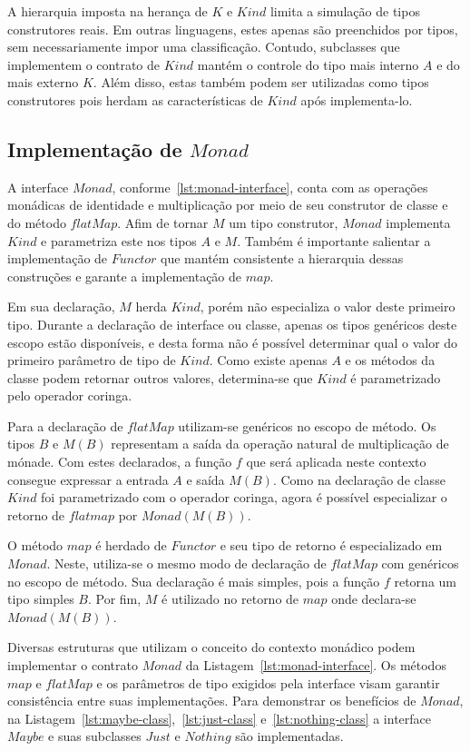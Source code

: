 \documentclass[10pt, conference]{IEEEtran}
\begin{document}
A hierarquia imposta na herança de $K$ e $Kind$ limita a simulação de tipos construtores reais. Em outras linguagens, estes apenas são preenchidos por tipos, sem necessariamente impor uma classificação. Contudo, subclasses que implementem o contrato de $Kind$ mantém o controle do tipo mais interno $A$ e do mais externo $K$. Além disso, estas também podem ser utilizadas como tipos construtores pois herdam as características de $Kind$ após implementa-lo.

\subsection{Implementação de $Monad$}

A interface $Monad$, conforme~\ref{lst:monad-interface}, conta com as operações monádicas de identidade e multiplicação por meio de seu construtor de classe e do método $flatMap$. Afim de tornar $M$ um tipo construtor,  $Monad$ implementa $Kind$ e parametriza este nos tipos $A$ e $M$. Também é importante salientar a implementação de $Functor$ que mantém consistente a hierarquia dessas construções e garante a implementação de $map$.

Em sua declaração, $M$ herda $Kind$, porém não especializa o valor deste primeiro tipo. Durante a declaração de interface ou classe, apenas os tipos genéricos deste escopo estão disponíveis, e desta forma não é possível determinar qual o valor do primeiro parâmetro de tipo de $Kind$. Como existe apenas $A$ e os métodos da classe podem retornar outros valores, determina-se que $Kind$ é parametrizado pelo operador coringa.

Para a declaração de $flatMap$ utilizam-se genéricos no escopo de método. Os tipos $B$ e $M(B)$ representam a saída da operação natural de multiplicação de mónade. Com estes declarados, a função $f$ que será aplicada neste contexto consegue expressar a entrada $A$ e saída $M(B)$. Como na declaração de classe $Kind$ foi parametrizado com o operador coringa, agora é possível especializar o retorno de $flatmap$ por $Monad(M(B))$.

O método $map$ é herdado de $Functor$ e seu tipo de retorno é especializado em $Monad$. Neste,  utiliza-se o mesmo modo de declaração de $flatMap$ com genéricos no escopo de método. Sua declaração é mais simples, pois a função $f$ retorna um tipo simples $B$. Por fim, $M$ é utilizado no retorno de $map$ onde declara-se $Monad(M(B))$.

Diversas estruturas que utilizam o conceito do contexto monádico podem implementar o contrato $Monad$ da Listagem~\ref{lst:monad-interface}. Os métodos $map$ e $flatMap$ e os parâmetros de tipo exigidos pela interface visam garantir consistência entre suas implementações. Para demonstrar os benefícios de $Monad$, na Listagem~\ref{lst:maybe-class},~\ref{lst:just-class} e~\ref{lst:nothing-class} a interface $Maybe$ e suas subclasses $Just$ e $Nothing$ são implementadas.
\end{document}
